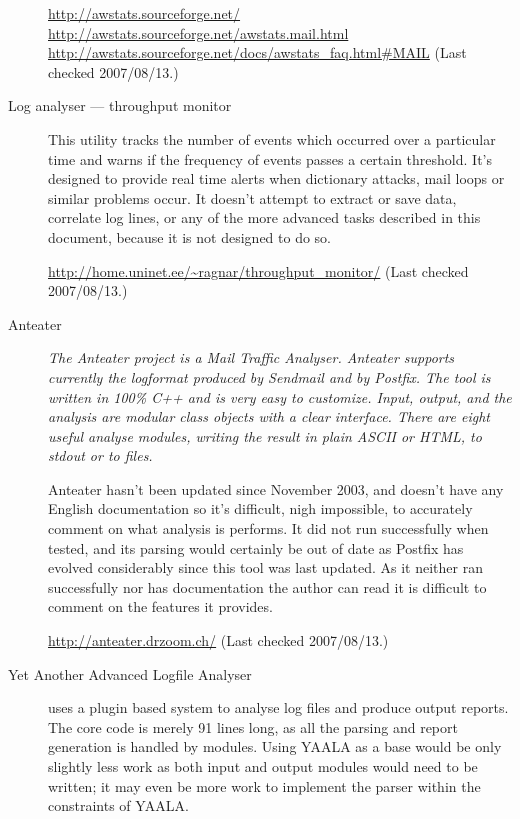 \documentclass[a4paper,12pt,draft]{article}
\begin{document}
\begin{description}
        \url{http://awstats.sourceforge.net/} \newline
        \url{http://awstats.sourceforge.net/awstats.mail.html} \newline
        \url{http://awstats.sourceforge.net/docs/awstats_faq.html#MAIL}
        \newline (Last checked 2007/08/13.)

    \item [Log analyser --- throughput monitor] This utility tracks the
        number of events which occurred over a particular time and warns if
        the frequency of events passes a certain threshold.  It's designed
        to provide real time alerts when dictionary attacks, mail loops or
        similar problems occur. It doesn't attempt to extract or save data,
        correlate log lines, or any of the more advanced tasks described in
        this document, because it is not designed to do so.

        \url{http://home.uninet.ee/~ragnar/throughput_monitor/} \newline
        (Last checked 2007/08/13.)

    \item [Anteater] \textit{The Anteater project is a Mail Traffic
        Analyser. Anteater supports currently the logformat produced by
        Sendmail and by Postfix. The tool is written in 100\% C++ and is
        very easy to customize. Input, output, and the analysis are modular
        class objects with a clear interface. There are eight useful
        analyse modules, writing the result in plain ASCII or HTML, to
        stdout or to files.\/}

        Anteater hasn't been updated since November 2003, and doesn't have
        any English documentation so it's difficult, nigh impossible, to
        accurately comment on what analysis is performs.  It did not run
        successfully when tested, and its parsing would certainly be out of
        date as Postfix has evolved considerably since this tool was last
        updated.  As it neither ran successfully nor has documentation the
        author can read it is difficult to comment on the features it
        provides.
        
        \url{http://anteater.drzoom.ch/} \newline (Last checked
        2007/08/13.)

    \item [Yet Another Advanced Logfile Analyser] uses a plugin based
        system to analyse log files and produce output reports.  The core
        code is merely 91 lines long, as all the parsing and report
        generation is handled by modules.  Using YAALA as a base would be
        only slightly less work as both input and output modules would need
        to be written; it may even be more work to implement the parser
        within the constraints of YAALA\@.


\end{description}
\end{document}
